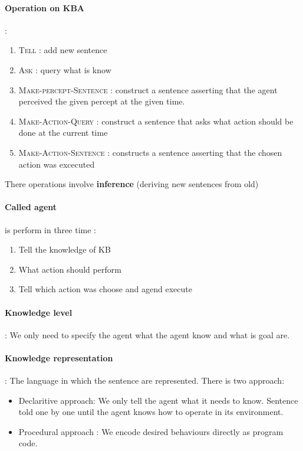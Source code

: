 \paragraph{Operation on KBA} :
\begin{enumerate}
    \item \textsc{Tell} : add new sentence
    \item \textsc{Ask} : query what is know

    \item \textsc{Make-percept-Sentence} : construct a sentence asserting that the agent perceived
        the given percept at the given time.
    \item \textsc{Make-Action-Query} : construct a sentence that asks what action should be done at the current time
    \item \textsc{Make-Action-Sentence} : constructs a sentence asserting that the chosen action was excecuted
\end{enumerate}

There operations involve \textbf{inference} (deriving new sentences from old)

\paragraph{Called agent} is perform in three time :
\begin{enumerate}
    \item Tell the knowledge of KB
    \item What action should perform
    \item Tell which action was choose and agend execute
\end{enumerate}

\paragraph{Knowledge level} : We only need to specify the agent what the agent know and what is goal are.

\paragraph{Knowledge representation} : The language in which the sentence are represented.
There is two approach:
	\begin{itemize}
		\item Declaritive approach:  We only tell the agent what it needs to know. Sentence told one by one 
		until the agent knows how to operate in its environment.
		\item Procedural approach : We encode desired behaviours directly as program code.
	\end{itemize}
